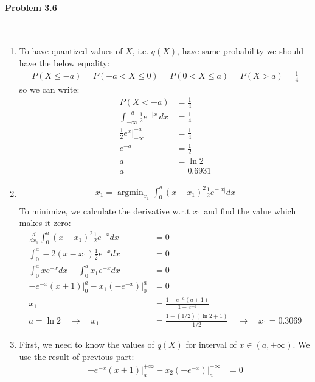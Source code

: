 \documentclass[12pt, letterpaper]{scrartcl}
\DeclareMathOperator*{\argmin}{argmin} %
\begin{document}
\paragraph*{Problem 3.6} \hfill\\
\begin{enumerate}[((a))]
    \item To have quantized values of $X$, i.e. $q(X)$, have same probability we should have the below equality:
    \begin{align*}
        P(X\leq-a)=P(-a<X\leq0)=P(0<X\leq a)=P(X>a)=\frac{1}{4}
    \end{align*}
    so we can write:
    \begin{align*}
        P(X<-a)&=\frac{1}{4}\\
        \int_{-\infty}^{-a}\frac{1}{2}e^{-|x|}dx&=\frac{1}{4}\\
        \frac{1}{2}e^x\bigg\rvert_{-\infty}^{-a}&=\frac{1}{4}\\
        e^{-a}&=\frac{1}{2}\\
        a&=\ln2\\
        a&=0.6931
    \end{align*}
    \item 
    \begin{align*}
        x_1=\argmin_{x_1}\int_{0}^{a}(x-x_1)^2\frac{1}{2}e^{-|x|}dx\\
    \end{align*}
    To minimize, we calculate the derivative w.r.t $x_1$ and find the value which makes it zero:
    \begin{align*}
        \frac{d}{dx_1}\int_{0}^{a}(x-x_1)^2\frac{1}{2}e^{-x}dx&=0\\
        \int_{0}^{a}-2(x-x_1)\frac{1}{2}e^{-x}dx&=0\\
        \int_{0}^{a}xe^{-x}dx-\int_{0}^{a}x_1e^{-x}dx&=0\\
        -e^{-x}(x+1)\bigg\rvert_{0}^{a}-x_1(-e^{-x})\bigg\rvert_{0}^{a}&=0\\
        x_1&=\frac{1-e^{-a}(a+1)}{1-e^{-a}}\\
        a=\ln2 \quad \longrightarrow \quad x_1&=\frac{1-(1/2)(\ln2+1)}{1/2} \quad \longrightarrow \quad x_1=0.3069
    \end{align*}
    \item
    First, we need to know the values of $q(X)$ for interval of $x\in (a,+\infty)$. We use the result of previous part:
    \begin{align*}
        -e^{-x}(x+1)\bigg\rvert_{a}^{+\infty}-x_2(-e^{-x})\bigg\rvert_{a}^{+\infty}&=0\\

\end{align*}
\end{enumerate}
\end{document}
